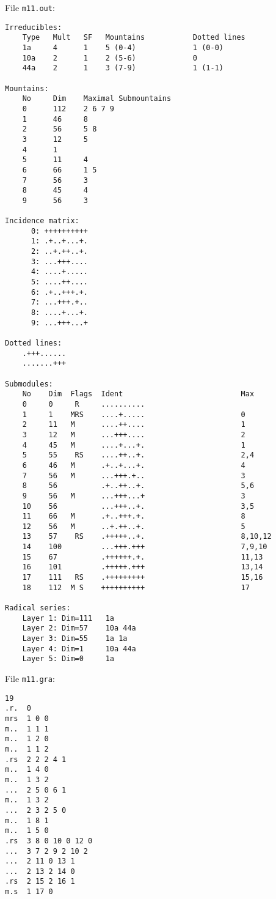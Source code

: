 File {\tt m11.out}:
\begin{verbatim}
Irreducibles:
    Type   Mult   SF   Mountains           Dotted lines
    1a     4      1    5 (0-4)             1 (0-0)             
    10a    2      1    2 (5-6)             0                   
    44a    2      1    3 (7-9)             1 (1-1)             

Mountains:
    No     Dim    Maximal Submountains
    0      112    2 6 7 9 
    1      46     8 
    2      56     5 8 
    3      12     5 
    4      1      
    5      11     4 
    6      66     1 5 
    7      56     3 
    8      45     4 
    9      56     3 

Incidence matrix:
      0: ++++++++++
      1: .+..+...+.
      2: ..+.++..+.
      3: ...+++....
      4: ....+.....
      5: ....++....
      6: .+..+++.+.
      7: ...+++.+..
      8: ....+...+.
      9: ...+++...+

Dotted lines:
    .+++......
    .......+++

Submodules:
    No    Dim  Flags  Ident                           Max
    0     0     R     ..........                      
    1     1    MRS    ....+.....                      0
    2     11   M      ....++....                      1
    3     12   M      ...+++....                      2
    4     45   M      ....+...+.                      1
    5     55    RS    ....++..+.                      2,4
    6     46   M      .+..+...+.                      4
    7     56   M      ...+++.+..                      3
    8     56          .+..++..+.                      5,6
    9     56   M      ...+++...+                      3
    10    56          ...+++..+.                      3,5
    11    66   M      .+..+++.+.                      8
    12    56   M      ..+.++..+.                      5
    13    57    RS    .+++++..+.                      8,10,12
    14    100         ...+++.+++                      7,9,10
    15    67          .++++++.+.                      11,13
    16    101         .+++++.+++                      13,14
    17    111   RS    .+++++++++                      15,16
    18    112  M S    ++++++++++                      17

Radical series:
    Layer 1: Dim=111   1a 
    Layer 2: Dim=57    10a 44a 
    Layer 3: Dim=55    1a 1a 
    Layer 4: Dim=1     10a 44a 
    Layer 5: Dim=0     1a 
\end{verbatim}

\noindent File {\tt m11.gra}:
\begin{verbatim}
19
.r.  0
mrs  1 0 0
m..  1 1 1
m..  1 2 0
m..  1 1 2
.rs  2 2 2 4 1
m..  1 4 0
m..  1 3 2
...  2 5 0 6 1
m..  1 3 2
...  2 3 2 5 0
m..  1 8 1
m..  1 5 0
.rs  3 8 0 10 0 12 0
...  3 7 2 9 2 10 2
...  2 11 0 13 1
...  2 13 2 14 0
.rs  2 15 2 16 1
m.s  1 17 0
\end{verbatim}


